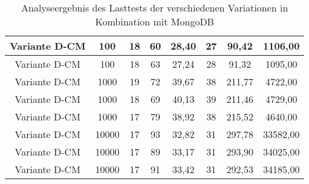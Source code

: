\begin{anhang}
\begin{landscape}
\begin{table}[h!]
\begin{tabular}{ |c|c|c|c|c|c|c|c|}
		\hline
		Variante D-CM & 100 & 18 & 60 & 28,40 & 27 & 90,42 & 1106,00 \\
		\hline
		Variante D-CM & 100 & 18 & 63 & 27,24 & 28 & 91,32 & 1095,00 \\
		\hline
		Variante D-CM & 1000 & 19 & 72 & 39,67 & 38 & 211,77 & 4722,00 \\
		\hline
		Variante D-CM & 1000 & 18 & 69 & 40,13 & 39 & 211,46 & 4729,00 \\
		\hline
		Variante D-CM & 1000 & 17 & 79 & 38,92 & 38 & 215,52 & 4640,00 \\
		\hline
		Variante D-CM & 10000 & 17 & 93 & 32,82 & 31 & 297,78 & 33582,00 \\
		\hline
		Variante D-CM & 10000 & 17 & 89 & 33,17 & 31 & 293,90 & 34025,00 \\
		\hline
		Variante D-CM & 10000 & 17 & 91 & 33,42 & 31 & 292,53 & 34185,00 \\
		\hline
	\end{tabular}
	\caption{Analyseergebnis des Lasttests der verschiedenen Variationen in Kombination mit MongoDB}
	\label{fig:performance-mongo}
\end{table}
\end{landscape}


\end{anhang}
